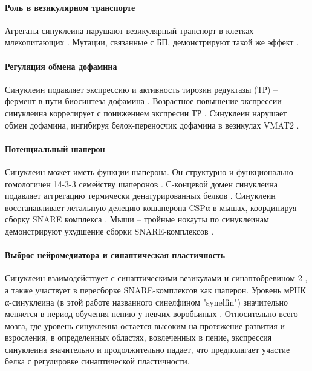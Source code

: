 \paragraph{Роль в везикулярном транспорте} Агрегаты синуклеина нарушают везикулярный транспорт в клетках млекопитающих \cite{gosavi_golgi_2002}. Мутации, связанные с БП, демонстрируют такой же эффект \cite{thayanidhi_alpha-synuclein_2010}. 

\paragraph{Регуляция обмена дофамина} Синуклеин подавляет экспрессию и активность тирозин редуктазы (ТР) -- фермент в пути биосинтеза дофамина \cite{yu_inhibition_2004} . Возрастное повышение экспрессии синуклеина коррелирует с понижением экспресии ТР \cite{chu_age-associated_2007} . Синуклеин нарушает обмен дофамина, ингибируя белок-переносчик дофамина в везикулах VMAT2 \cite{guo_inhibition_2008} .

\paragraph{Потенциальный шаперон} Синуклеин может иметь функции шаперона. Он структурно и функционально гомологичен 14-3-3 семейству шаперонов \cite{ostrerova_alpha-synuclein_1999}. С-концевой домен синуклеина подавляет аггрегацию термически денатурированных белков \cite{kim_structural_2002}. Синуклеин восстанавливает летальную делецию кошаперона CSPα в мышах, координируя сборку SNARE комплекса\cite{chandra_alpha-synuclein_2005} . Мыши -- тройные нокауты по синуклеинам демонстрируют ухудшение сборки SNARE-комплексов \cite{greten-harrison_-synuclein_2010}.

\paragraph{Выброс нейромедиатора и синаптичеcкая пластичность}
Синуклеин взаимодействует с синаптическими везикулами \cite{maroteaux_synuclein:_1988} и синаптобревином-2 \cite{burre_-synuclein_2010}, а также участвует в пересборке SNARE-комплексов как шаперон.
Уровень мРНК α-синуклеина (в этой работе названного синелфином "synelfin") значительно меняется в период обучения пению у певчих воробьиных \cite{george_characterization_1995}. Относительно всего мозга, где уровень синуклеина остается высоким на протяжение развития и взросления, в определенных областях, вовлеченных в пение, экспрессия синуклеина значительно и продолжительно падает, что предполагает участие белка с регулировке синаптической пластичности. 

